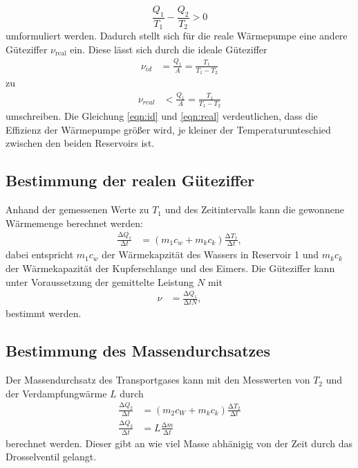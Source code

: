 \begin{equation}
  \label{eqn:2HS1}
  \frac{Q_1}{T_1} - \frac{Q_2}{T_2} > 0
\end{equation}
umformuliert werden.
Dadurch stellt sich für die reale Wärmepumpe eine andere Güteziffer $\nu_{\text{real}}$ ein.
Diese lässt sich durch die ideale Güteziffer
\begin{align}
  \nu_{id}   &= \frac{Q_1}{A} = \frac{T_1}{T_1 - T_2} \label{eqn:id}
\end{align}
zu
\begin{align}
  \nu_{real} &< \frac{Q_1}{A} = \frac{T_1}{T_1 - T_2} \label{eqn:real}
\end{align}
umschreiben.
\newline
Die Gleichung \ref{eqn:id} und \ref{eqn:real} verdeutlichen, dass die Effizienz der Wärmepumpe
größer wird, je kleiner der Temperaturunteschied zwischen den beiden Reservoirs ist.

\subsection{Bestimmung der realen Güteziffer}
Anhand der gemessenen Werte zu $T_1$ und des Zeitintervalls kann die gewonnene Wärmemenge berechnet werden:
\begin{align}
  \label{eqn:Gue}
  \frac{\increment Q_1}{\increment t} &= (m_1c_w + m_kc_k) \frac{\increment T_1}{\increment t},
\end{align}
dabei entspricht $m_1c_w$ der Wärmekapzität des Wassers in Reservoir 1 und $m_kc_k$ der Wärmekapazität
der Kupferschlange und des Eimers.
Die Güteziffer kann unter Voraussetzung der gemittelte Leistung $N$ mit
\begin{align}
    \nu  &= \frac{\increment Q_1}{\increment t N},
    \label{eqn:nu}
\end{align}
bestimmt werden.
\subsection{Bestimmung des Massendurchsatzes}
Der Massendurchsatz des Transportgases kann mit den Messwerten von $T_2$ und der Verdampfungwärme
$L$ durch
\begin{align}
  \label{eqn:masds}
  \frac{\increment Q_2}{\increment t} &= (m_2 c_W + m_k c_k) \frac{\increment T_2}{\increment t} \\
  \frac{\increment Q_2}{\increment t} &= L \frac{\increment m}{\increment t}
  \label{eqn:msds}
\end{align}
berechnet werden. Dieser gibt an wie viel Masse abhänigig von der Zeit durch das Drosselventil
gelangt.
